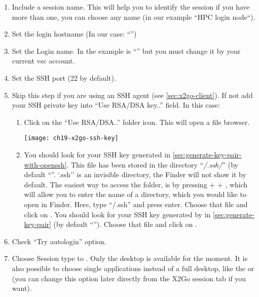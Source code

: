 \begin{enumerate}
    \item  Include a session name. This will help you to identify 
    the session if you have more than one, you can choose any name (in our example ``HPC login node``).
    \item  Set the login hostname (In our case: ``\strong{\emph{\loginnode}}'')
    \item  Set the Login name. In the example is ``\strong{\userid}'' but you must change it by your
    current vsc account.
    \item  Set the SSH port (22 by default).
    \item  Skip this step if you are using an SSH agent (see \autoref{sec:x2go-client}).
    If not add your SSH private key into ``Use RSA/DSA key..'' field. In this case:
    \begin{enumerate}
     \item Click on the ``Use RSA/DSA..'' folder icon. This will open a file browser. 
     \begin{center}
       \texttt{[image: ch19-x2go-ssh-key]}
     \end{center}
     \item
     \ifmacORlinux
     You should look for your  SSH key generated in \autoref{sec:generate-key-pair-with-openssh}.
     This file has been stored in the directory ``\emph{\tilde/.ssh/}'' (by default ``''.
     `.ssh'' is an invisible directory, the Finder will
      not show it by default. The easiest way to access the folder, is by pressing
       +  + , which will allow you to enter the name of a directory, which
     you would like to open in Finder. Here, type ``\tilde/.ssh'' and press enter.
     Choose that file and click on .
     \fi
     \ifwindows
     You should look for your  SSH key generated by  in \autoref{sec:generate-key-pair}
     (by default ``'').
     Choose that file and click on .
     \fi
    \end{enumerate}
    \item  Check ``Try autologin'' option.
    \item  Choose Session type to . Only the  desktop is available for the moment.
    It is also possible to choose single applications instead of a full desktop, like the 
    or  (you can change this option later directly from the X2Go session tab if you want).

\end{enumerate}
